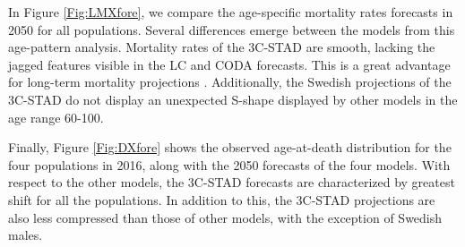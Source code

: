 \documentclass[11pt, a4paper]{article}
\begin{document}
In Figure \ref{Fig:LMXfore}, we compare the age-specific mortality rates forecasts in 2050 for all populations. Several differences emerge between the models from this age-pattern analysis. Mortality rates of the 3C-STAD are smooth, lacking the jagged features visible in the LC and CODA forecasts. This is a great advantage for long-term mortality projections \citep{li2013extending}. Additionally, the Swedish projections of the 3C-STAD do not display an unexpected S-shape displayed by other models in the age range 60-100. 

Finally, Figure \ref{Fig:DXfore} shows the observed age-at-death distribution for the four populations in 2016, along with the 2050 forecasts of the four models. With respect to the other models, the 3C-STAD forecasts are characterized by greatest shift for all the populations. In addition to this, the 3C-STAD projections are also less compressed than those of other models, with the exception of Swedish males.


\end{document}
